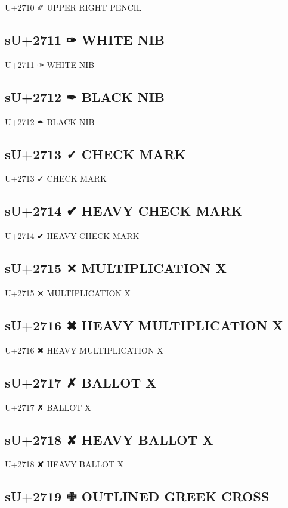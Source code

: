 U+2710 ✐ UPPER RIGHT PENCIL

\subsection{sU+2711 ✑ WHITE NIB}

U+2711 ✑ WHITE NIB

\subsection{sU+2712 ✒ BLACK NIB}

U+2712 ✒ BLACK NIB

\subsection{sU+2713 ✓ CHECK MARK}

U+2713 ✓ CHECK MARK

\subsection{sU+2714 ✔ HEAVY CHECK MARK}

U+2714 ✔ HEAVY CHECK MARK

\subsection{sU+2715 ✕ MULTIPLICATION X}

U+2715 ✕ MULTIPLICATION X

\subsection{sU+2716 ✖ HEAVY MULTIPLICATION X}

U+2716 ✖ HEAVY MULTIPLICATION X

\subsection{sU+2717 ✗ BALLOT X}

U+2717 ✗ BALLOT X

\subsection{sU+2718 ✘ HEAVY BALLOT X}

U+2718 ✘ HEAVY BALLOT X

\subsection{sU+2719 ✙ OUTLINED GREEK CROSS}

